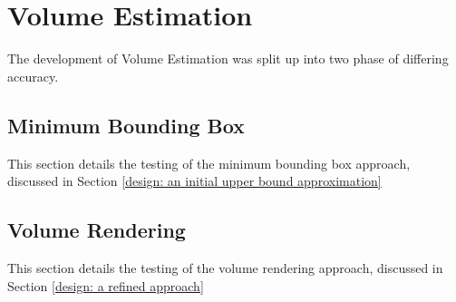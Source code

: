 \section{Volume Estimation}
\label{volume estimation}
The development of Volume Estimation was split up into two phase of differing accuracy.
\subsection{Minimum Bounding Box}
\label{testing: minimum bounding box}
This section details the testing of the minimum bounding box approach, discussed in Section \ref{design: an initial upper bound approximation}
\subsection{Volume Rendering}
\label{testing: volume rendering}
This section details the testing of the volume rendering approach, discussed in Section \ref{design: a refined approach}